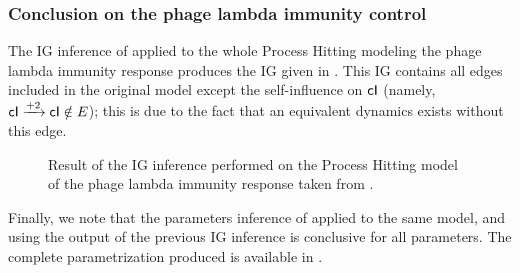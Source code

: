 \subsubsection{Conclusion on the phage lambda immunity control}

The IG inference of  applied to the whole Process Hitting modeling
the phage lambda immunity response produces the IG given in .
This IG contains all edges included in the original model except the
self-influence on $\mathsf{cI}$ (namely, $\mathsf{cI} \xrightarrow{+ 2} \mathsf{cI} \notin E$);
this is due to the fact that an equivalent dynamics exists without this edge.

\begin{figure}[t]
\centering
{}
\caption{\label{fig:phage-lambda-ig}%
  Result of the IG inference performed on the Process Hitting model
  of the phage lambda immunity response
  taken from \cite{thieffry_dynamical_1995}.
}
\end{figure}

Finally, we note that the parameters inference of  applied to the same model,
and using the output of the previous IG inference is conclusive for all parameters.
The complete parametrization produced is available in .

